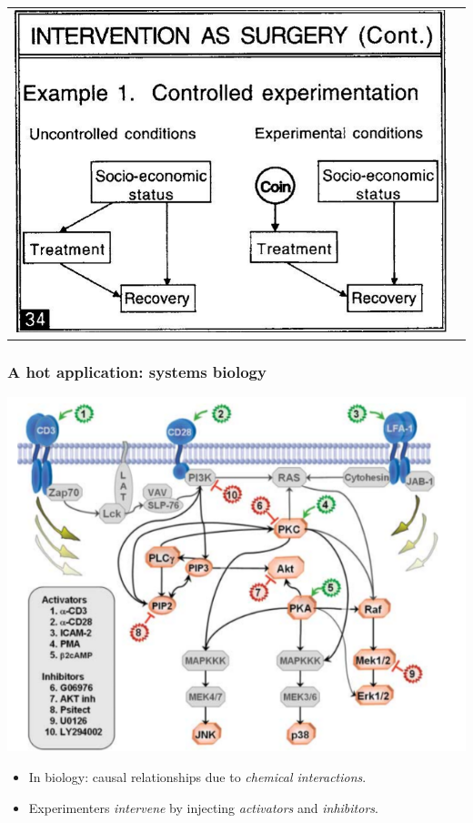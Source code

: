 \documentclass{beamer}
\begin{document}
\begin{frame}
\begin{tabular}{cc}
\includegraphics[scale=0.25]{../images/pearl34.png}
\end{tabular}
\end{frame}

\begin{frame}
\frametitle{A hot application: systems biology}
\begin{center}
\includegraphics[scale=0.3]{../images/cyto_graph.png}
\end{center}
\begin{itemize}
\item In biology: causal relationships due to \emph{chemical interactions}.
\item Experimenters \emph{intervene} by injecting \emph{activators} and \emph{inhibitors}.
\end{itemize}
\end{frame}
\end{document}
